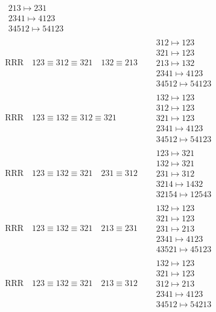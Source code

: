 \documentclass{article}
\begin{document}
\begin{align}
\begin{matrix}
\\
213 \mapsto 231
\\
2341 \mapsto 4123
\\
34512 \mapsto 54123
\end{matrix}
\\
\text{RRR}
\quad
123\equiv312\equiv321
\quad
132\equiv213
\quad
&
\begin{matrix}
312 \mapsto 123
\\
321 \mapsto 123
\\
213 \mapsto 132
\\
2341 \mapsto 4123
\\
34512 \mapsto 54123
\end{matrix}
\\
\text{RRR}
\quad
123\equiv132\equiv312\equiv321
\quad
&
\begin{matrix}
132 \mapsto 123
\\
312 \mapsto 123
\\
321 \mapsto 123
\\
2341 \mapsto 4123
\\
34512 \mapsto 54123
\end{matrix}
\\
\text{RRR}
\quad
123\equiv132\equiv321
\quad
231\equiv312
\quad
&
\begin{matrix}
123 \mapsto 321
\\
132 \mapsto 321
\\
231 \mapsto 312
\\
3214 \mapsto 1432
\\
32154 \mapsto 12543
\end{matrix}
\\
\text{RRR}
\quad
123\equiv132\equiv321
\quad
213\equiv231
\quad
&
\begin{matrix}
132 \mapsto 123
\\
321 \mapsto 123
\\
231 \mapsto 213
\\
2341 \mapsto 4123
\\
43521 \mapsto 45123
\end{matrix}
\\
\text{RRR}
\quad
123\equiv132\equiv321
\quad
213\equiv312
\quad
&
\begin{matrix}
132 \mapsto 123
\\
321 \mapsto 123
\\
312 \mapsto 213
\\
2341 \mapsto 4123
\\
34512 \mapsto 54213
\end{matrix}

\end{align}
\end{document}
